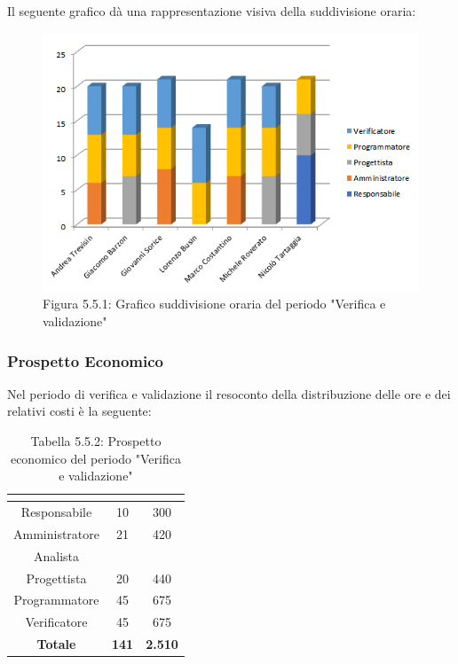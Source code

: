 Il seguente grafico dà una rappresentazione visiva della suddivisione oraria: \\
\begin{figure} [H]
	\centering
	\includegraphics[scale=1]{Res/ExcelGrafici/Grafici/VerificaOre.png}
	\caption{Figura 5.5.1: Grafico suddivisione oraria del periodo "Verifica e validazione"}\label{}
\end{figure}


\subsubsection{Prospetto Economico}
Nel periodo di verifica e validazione il resoconto della distribuzione delle ore e dei relativi costi è la seguente:

\renewcommand{\arraystretch}{1.5}
\begin{table}[H]
\begin{center}
\begin{tabular}{|c|c|c|}
\hline
\rowcolor{title_row}
\textbf{\color{title_text}{Ruolo}}  & \textbf{\color{title_text}{Ore}} & \textbf{\color{title_text}{Costo in \euro}} \\ \hline
Responsabile    & 10 & 300 \\ \hline
Amministratore  & 21 & 420 \\ \hline
Analista        & & \\ \hline
Progettista     & 20 & 440 \\ \hline
Programmatore   & 45 & 675 \\ \hline
Verificatore    & 45 & 675 \\ \hline
\textbf{Totale} & \textbf{141}    & \textbf{2.510}           \\ \hline
\end{tabular}
\caption{Tabella 5.5.2: Prospetto economico del periodo "Verifica e validazione"\label{}}
\end{center}
\end{table}
\renewcommand{\arraystretch}{1}

